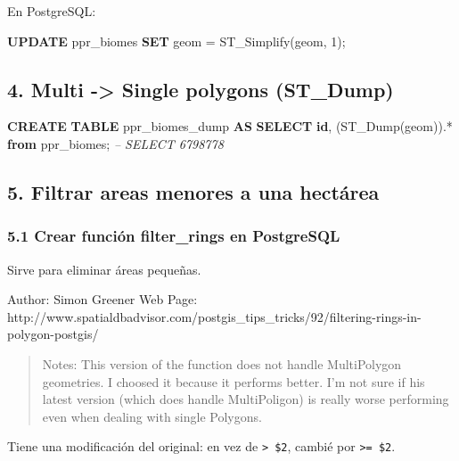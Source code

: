 \documentclass[spanish,]{article}
\newenvironment{Shaded}{}{}
\newcommand{\KeywordTok}[1]{\textcolor[rgb]{0.00,0.44,0.13}{\textbf{{#1}}}}
\newcommand{\DecValTok}[1]{\textcolor[rgb]{0.25,0.63,0.44}{{#1}}}
\newcommand{\CommentTok}[1]{\textcolor[rgb]{0.38,0.63,0.69}{\textit{{#1}}}}
\newcommand{\NormalTok}[1]{{#1}}
\begin{document}
En PostgreSQL:

\begin{Shaded}
\begin{Highlighting}[]
\KeywordTok{UPDATE} \NormalTok{ppr_biomes }\KeywordTok{SET} \NormalTok{geom = ST_Simplify(geom, }\DecValTok{1}\NormalTok{);}
\end{Highlighting}
\end{Shaded}

\subsection{4. Multi -\textgreater{} Single polygons
(ST\_Dump)}\label{multi---single-polygons-stux5fdump}

\begin{Shaded}
\begin{Highlighting}[]
\KeywordTok{CREATE} \KeywordTok{TABLE} \NormalTok{ppr_biomes_dump }\KeywordTok{AS}
  \KeywordTok{SELECT} \KeywordTok{id}\NormalTok{, (ST_Dump(geom)).* }\KeywordTok{from} \NormalTok{ppr_biomes;}
\CommentTok{-- SELECT 6798778}
\end{Highlighting}
\end{Shaded}

\subsection{5. Filtrar areas menores a una
hectárea}\label{filtrar-areas-menores-a-una-hectuxe1rea}

\subsubsection{5.1 Crear función filter\_rings en
PostgreSQL}\label{crear-funciuxf3n-filterux5frings-en-postgresql}

Sirve para eliminar áreas pequeñas.

Author: Simon Greener Web Page:
http://www.spatialdbadvisor.com/postgis\_tips\_tricks/92/filtering-rings-in-polygon-postgis/

\begin{quote}
Notes: This version of the function does not handle MultiPolygon
geometries. I choosed it because it performs better. I'm not sure if his
latest version (which does handle MultiPoligon) is really worse
performing even when dealing with single Polygons.
\end{quote}

Tiene una modificación del original: en vez de
\texttt{\textgreater{}\ \$2}, cambié por \texttt{\textgreater{}=\ \$2}.
\end{document}
